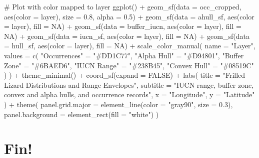 \documentclass[
  letterpaper,
  DIV=11,
  numbers=noendperiod]{scrartcl}
\newenvironment{Shaded}{\begin{snugshade}}{\end{snugshade}}
\newcommand{\AttributeTok}[1]{\textcolor[rgb]{0.40,0.45,0.13}{#1}}
\newcommand{\CommentTok}[1]{\textcolor[rgb]{0.37,0.37,0.37}{#1}}
\newcommand{\ConstantTok}[1]{\textcolor[rgb]{0.56,0.35,0.01}{#1}}
\newcommand{\FloatTok}[1]{\textcolor[rgb]{0.68,0.00,0.00}{#1}}
\newcommand{\FunctionTok}[1]{\textcolor[rgb]{0.28,0.35,0.67}{#1}}
\newcommand{\NormalTok}[1]{\textcolor[rgb]{0.00,0.23,0.31}{#1}}
\newcommand{\OtherTok}[1]{\textcolor[rgb]{0.00,0.23,0.31}{#1}}
\newcommand{\SpecialCharTok}[1]{\textcolor[rgb]{0.37,0.37,0.37}{#1}}
\newcommand{\StringTok}[1]{\textcolor[rgb]{0.13,0.47,0.30}{#1}}
\begin{document}
\begin{Shaded}
\begin{Highlighting}[]
\CommentTok{\# Plot with color mapped to \textasciigrave{}layer\textasciigrave{}}
\FunctionTok{ggplot}\NormalTok{() }\SpecialCharTok{+}
  \FunctionTok{geom\_sf}\NormalTok{(}\AttributeTok{data =}\NormalTok{ occ\_cropped, }\FunctionTok{aes}\NormalTok{(}\AttributeTok{color =}\NormalTok{ layer), }\AttributeTok{size =} \FloatTok{0.8}\NormalTok{, }\AttributeTok{alpha =} \FloatTok{0.5}\NormalTok{) }\SpecialCharTok{+}
  \FunctionTok{geom\_sf}\NormalTok{(}\AttributeTok{data =}\NormalTok{ ahull\_sf, }\FunctionTok{aes}\NormalTok{(}\AttributeTok{color =}\NormalTok{ layer), }\AttributeTok{fill =} \ConstantTok{NA}\NormalTok{) }\SpecialCharTok{+}
  \FunctionTok{geom\_sf}\NormalTok{(}\AttributeTok{data =}\NormalTok{ buffer\_iucn, }\FunctionTok{aes}\NormalTok{(}\AttributeTok{color =}\NormalTok{ layer), }\AttributeTok{fill =} \ConstantTok{NA}\NormalTok{) }\SpecialCharTok{+}
  \FunctionTok{geom\_sf}\NormalTok{(}\AttributeTok{data =}\NormalTok{ iucn\_sf, }\FunctionTok{aes}\NormalTok{(}\AttributeTok{color =}\NormalTok{ layer), }\AttributeTok{fill =} \ConstantTok{NA}\NormalTok{) }\SpecialCharTok{+}
  \FunctionTok{geom\_sf}\NormalTok{(}\AttributeTok{data =}\NormalTok{ hull\_sf, }\FunctionTok{aes}\NormalTok{(}\AttributeTok{color =}\NormalTok{ layer), }\AttributeTok{fill =} \ConstantTok{NA}\NormalTok{) }\SpecialCharTok{+}
  \FunctionTok{scale\_color\_manual}\NormalTok{(}
    \AttributeTok{name =} \StringTok{"Layer"}\NormalTok{,}
    \AttributeTok{values =} \FunctionTok{c}\NormalTok{(}
      \StringTok{"Occurrences"} \OtherTok{=} \StringTok{"\#DD1C77"}\NormalTok{,}
      \StringTok{"Alpha Hull"} \OtherTok{=} \StringTok{"\#D94801"}\NormalTok{,}
      \StringTok{"Buffer Zone"} \OtherTok{=} \StringTok{"\#6BAED6"}\NormalTok{,}
      \StringTok{"IUCN Range"} \OtherTok{=} \StringTok{"\#238B45"}\NormalTok{,}
      \StringTok{"Convex Hull"} \OtherTok{=} \StringTok{"\#08519C"}
\NormalTok{    )}
\NormalTok{  ) }\SpecialCharTok{+}
  \FunctionTok{theme\_minimal}\NormalTok{() }\SpecialCharTok{+}
  \FunctionTok{coord\_sf}\NormalTok{(}\AttributeTok{expand =} \ConstantTok{FALSE}\NormalTok{) }\SpecialCharTok{+}
  \FunctionTok{labs}\NormalTok{(}
    \AttributeTok{title =} \StringTok{"Frilled Lizard Distributions and Range Envelopes"}\NormalTok{,}
    \AttributeTok{subtitle =} \StringTok{"IUCN range, buffer zone, convex and alpha hulls, and occurrence records"}\NormalTok{,}
    \AttributeTok{x =} \StringTok{"Longitude"}\NormalTok{, }\AttributeTok{y =} \StringTok{"Latitude"}
\NormalTok{  ) }\SpecialCharTok{+}
  \FunctionTok{theme}\NormalTok{(}
    \AttributeTok{panel.grid.major =} \FunctionTok{element\_line}\NormalTok{(}\AttributeTok{color =} \StringTok{"gray90"}\NormalTok{, }\AttributeTok{size =} \FloatTok{0.3}\NormalTok{),}
    \AttributeTok{panel.background =} \FunctionTok{element\_rect}\NormalTok{(}\AttributeTok{fill =} \StringTok{"white"}\NormalTok{)}
\NormalTok{  )}
\end{Highlighting}
\end{Shaded}

\section{Fin!}\label{fin}
\end{document}

